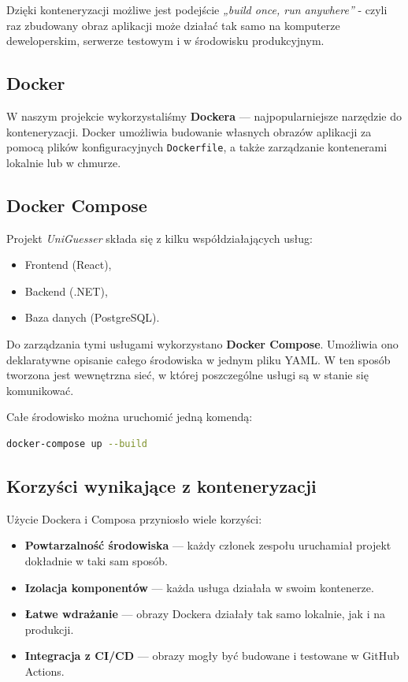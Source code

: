 Dzięki konteneryzacji możliwe jest podejście \textit{„build once, run anywhere”} - czyli raz zbudowany obraz aplikacji może działać tak samo na komputerze deweloperskim, serwerze testowym i w środowisku produkcyjnym.

\subsection{Docker}

W naszym projekcie wykorzystaliśmy \textbf{Dockera} --- najpopularniejsze narzędzie do konteneryzacji. Docker umożliwia budowanie własnych obrazów aplikacji za pomocą plików konfiguracyjnych \texttt{Dockerfile}, a także zarządzanie kontenerami lokalnie lub w chmurze.

\subsection{Docker Compose}

Projekt \textit{UniGuesser} składa się z kilku współdziałających usług:

\begin{itemize}
  \item Frontend (React),
  \item Backend (.NET),
  \item Baza danych (PostgreSQL).
\end{itemize}

Do zarządzania tymi usługami wykorzystano \textbf{Docker Compose}. Umożliwia ono deklaratywne opisanie całego środowiska w jednym pliku YAML. W ten sposób tworzona jest wewnętrzna sieć, w której poszczególne usługi są w stanie się komunikować.

Całe środowisko można uruchomić jedną komendą:

\begin{lstlisting}[language=bash]
docker-compose up --build
\end{lstlisting}

\subsection{Korzyści wynikające z konteneryzacji}

Użycie Dockera i Composa przyniosło wiele korzyści:

\begin{itemize}
  \item \textbf{Powtarzalność środowiska} — każdy członek zespołu uruchamiał projekt dokładnie w taki sam sposób.
  \item \textbf{Izolacja komponentów} — każda usługa działała w swoim kontenerze.
  \item \textbf{Łatwe wdrażanie} — obrazy Dockera działały tak samo lokalnie, jak i na produkcji.
  \item \textbf{Integracja z CI/CD} — obrazy mogły być budowane i testowane w GitHub Actions.
\end{itemize}

